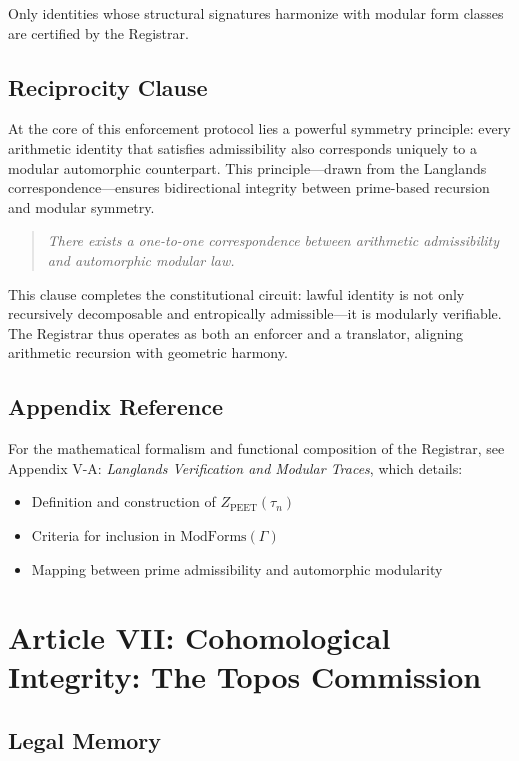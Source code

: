 \documentclass[12]{amsart}
\theoremstyle{plain}
\begin{document}
Only identities whose structural signatures harmonize with modular form classes are certified by the Registrar.

\subsection{Reciprocity Clause}

At the core of this enforcement protocol lies a powerful symmetry principle: every arithmetic identity that satisfies admissibility also corresponds uniquely to a modular automorphic counterpart. This principle—drawn from the Langlands correspondence—ensures bidirectional integrity between prime-based recursion and modular symmetry.

\begin{quote}
\textit{There exists a one-to-one correspondence between arithmetic admissibility and automorphic modular law.}
\end{quote}

This clause completes the constitutional circuit: lawful identity is not only recursively decomposable and entropically admissible—it is modularly verifiable. The Registrar thus operates as both an enforcer and a translator, aligning arithmetic recursion with geometric harmony.

\subsection*{Appendix Reference}

For the mathematical formalism and functional composition of the Registrar, see Appendix V-A: \textit{Langlands Verification and Modular Traces}, which details:

\begin{itemize}
  \item Definition and construction of $Z_{\text{PEET}}(\tau_n)$
  \item Criteria for inclusion in $\text{ModForms}(\Gamma)$
  \item Mapping between prime admissibility and automorphic modularity
\end{itemize}

\section{Article VII: Cohomological Integrity: The Topos Commission}

\subsection{Legal Memory}
\end{document}
